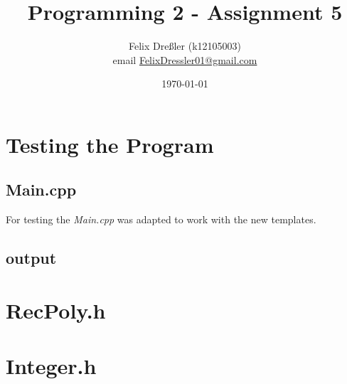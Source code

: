 \documentclass[11pt,titlepage]{article}
\title{Programming 2 - Assignment 5}
\author{Felix Dreßler (k12105003)\\ email \href{mailto:FelixDressler01@gmail.com}{FelixDressler01@gmail.com}}
\date{\today} %
\begin{document}
\maketitle
	
	\section{Testing the Program}
		\subsection{Main.cpp}
		For testing the \emph{Main.cpp} was adapted to work with the new templates.
			
		\subsection{output}
			
	
	\section{RecPoly.h}
			
	
	\section{Integer.h}
			
			
\end{document}
